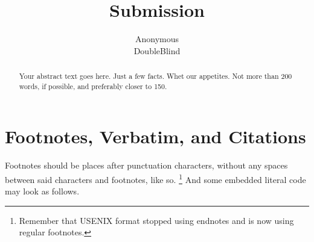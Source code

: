 \usepackage{filecontents}




\date{}

\title{\Large \bf Submission}

\author{
{\rm Anonymous}\\
DoubleBlind
} %

\maketitle

\begin{abstract}
Your abstract text goes here. Just a few facts. Whet our appetites.
Not more than 200 words, if possible, and preferably closer to 150.
\end{abstract}






\section{Footnotes, Verbatim, and Citations}

Footnotes should be places after punctuation characters, without any
spaces between said characters and footnotes, like so.%
\footnote{Remember that USENIX format stopped using endnotes and is
  now using regular footnotes.} And some embedded literal code may
look as follows.

